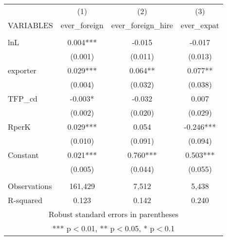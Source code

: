 \begin{tabular}{lccc} \hline
 & (1) & (2) & (3) \\
VARIABLES & ever\_foreign & ever\_foreign\_hire & ever\_expat \\ \hline
 &  &  &  \\
lnL & 0.004*** & -0.015 & -0.017 \\
 & (0.001) & (0.011) & (0.013) \\
exporter & 0.029*** & 0.064** & 0.077** \\
 & (0.004) & (0.032) & (0.038) \\
TFP\_cd & -0.003* & -0.032 & 0.007 \\
 & (0.002) & (0.020) & (0.029) \\
RperK & 0.029*** & 0.054 & -0.246*** \\
 & (0.010) & (0.091) & (0.094) \\
Constant & 0.021*** & 0.760*** & 0.503*** \\
 & (0.005) & (0.044) & (0.055) \\
 &  &  &  \\
Observations & 161,429 & 7,512 & 5,438 \\
 R-squared & 0.123 & 0.142 & 0.240 \\ \hline
\multicolumn{4}{c}{ Robust standard errors in parentheses} \\
\multicolumn{4}{c}{ *** p$<$0.01, ** p$<$0.05, * p$<$0.1} \\
\end{tabular}
